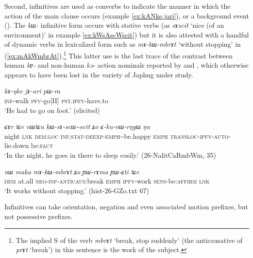 \documentclass[oneside,a4paper,11pt]{article}
\newcommand{\ipa}[1]{\textit{\phon#1}}
\newcommand{\jpg}[2]{\ipa{#1} `#2'}
\newcommand{\tld}{\textasciitilde{}}
\begin{document}
Second, infinitives are used as converbs to indicate the manner in which the action of the main clause occurs (example \ref{ex:kANke.jari}), or a background event (\citealt{jacques14linking}). The \ipa{kɯ-} infinitive form occurs with stative verbs (as \jpg{sɤscit}{nice (of an environment)} in example \ref{ex:kWsAscWscit}) but it is also attested with a handful of dynamic verbs in lexicalized form such as \ipa{mɤ-kɯ-mbrɤt} `without stopping' in (\ref{ex:mAkWmbrAt}).\footnote{The implied S of the verb \jpg{mbrɤt}{break, stop suddenly} (the anticausative of  \jpg{prɤt}{break}) in this sentence is the work of the subject.  } This latter use is the last trace of the contrast between human \ipa{kɐ-} and non-human \ipa{kə-} action nominals reported by \citet[476]{sun12complementation} and \citealt{jackson14morpho}, which otherwise appears to have been lost in the variety of Japhug under study.

\begin{exe}
\ex \label{ex:kANke.jari}
\gll
\ipa{kɤ-ŋke} 	\ipa{jɤ-ari} 	\ipa{pɯ-ra} \\
\textsc{inf}-walk \textsc{pfv}-go[II] \textsc{pst.ipfv}-have.to \\
\glt `He had to go on foot.' (elicited)
\end{exe}

\begin{exe}
\ex \label{ex:kWsAscWscit}
\gll
\ipa{ɕɤr} 	\ipa{tɕe} 	\ipa{nɯtɕu} 	\ipa{kɯ-sɤ-scɯ\tld{}scit} 	\ipa{ʑo} 	\ipa{ɕ-ku-nɯ-rŋgɯ} 	\ipa{ŋu} \\
night \textsc{lnk} \textsc{dem:loc} \textsc{inf:stat-deexp-emph}\tld{}be.happy \textsc{emph} \textsc{transloc-ipfv-auto}-lie.down be:\textsc{fact} \\
\glt `In the night, he goes in there to sleep cosily.' (26-NalitCaRmbWm, 35)
\end{exe}

\begin{exe}
\ex \label{ex:mAkWmbrAt}
\gll
 \ipa{nɯ} 	\ipa{maka} 	\ipa{mɤ-kɯ-mbrɤt} 	\ipa{ʑo} 	\ipa{ɲɯ-rɤma} 	\ipa{ɲɯ-ɕti} 	\ipa{tɕe} \\
 \textsc{dem} at.all \textsc{neg-inf-anticaus:}break \textsc{emph} \textsc{ipfv}-work \textsc{sens}-be:\textsc{affirm} \textsc{lnk} \\
\glt `It works without stopping.' (hist-26-GZo.txt 67)
\end{exe}

Infinitives can take orientation, negation and even associated motion prefixes, but not possessive prefixes.
 
\end{document}
